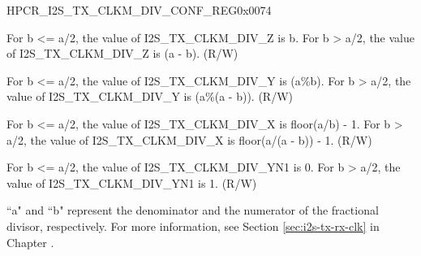 \begin{register}{H}{PCR\_I2S\_TX\_CLKM\_DIV\_CONF\_REG}{0x0074}\label{regdesc:PCRI2STXCLKMDIVCONFREG}
%
%
%
%
%
\regnewline%
\begin{regdesc}\begin{reglist}
\label{fielddesc:PCRI2STXCLKMDIVZ}\item [PCR\_I2S\_TX\_CLKM\_DIV\_Z] For b <= a/2, the value of I2S\_TX\_CLKM\_DIV\_Z is b. For b > a/2, the value of I2S\_TX\_CLKM\_DIV\_Z is (a - b). (R/W)
\label{fielddesc:PCRI2STXCLKMDIVY}\item [PCR\_I2S\_TX\_CLKM\_DIV\_Y] For b <= a/2, the value of I2S\_TX\_CLKM\_DIV\_Y is (a\%b). For b > a/2, the value of I2S\_TX\_CLKM\_DIV\_Y is (a\%(a - b)). (R/W)
\label{fielddesc:PCRI2STXCLKMDIVX}\item [PCR\_I2S\_TX\_CLKM\_DIV\_X] For b <= a/2, the value of I2S\_TX\_CLKM\_DIV\_X is floor(a/b) - 1. For b > a/2, the value of I2S\_TX\_CLKM\_DIV\_X is floor(a/(a - b)) - 1. (R/W)
\label{fielddesc:PCRI2STXCLKMDIVYN1}\item [PCR\_I2S\_TX\_CLKM\_DIV\_YN1] For b <= a/2, the value of I2S\_TX\_CLKM\_DIV\_YN1 is 0. For b > a/2, the value of I2S\_TX\_CLKM\_DIV\_YN1 is 1. (R/W)
\end{reglist}\end{regdesc}
\vspace{-2em}
\begin{tiplisting}
``a" and ``b" represent the denominator and the numerator of the fractional divisor, respectively. For more information, see Section \ref{sec:i2s-tx-rx-clk} in Chapter \textit{}.
\end{tiplisting}
\end{register}


